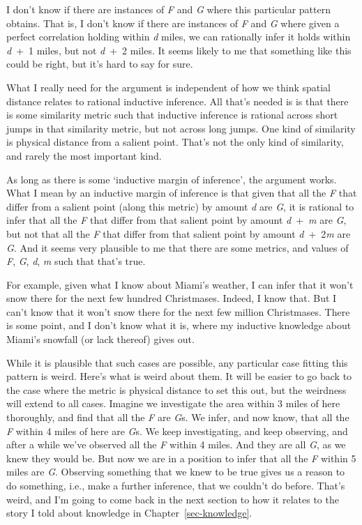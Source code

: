 \documentclass[
  12pt,
  letterpaper,
]{scrbook}
\begin{document}
I don't know if there are instances of \emph{F} and \emph{G} where this
particular pattern obtains. That is, I don't know if there are instances
of \emph{F} and \emph{G} where given a perfect correlation holding
within \emph{d} miles, we can rationally infer it holds within
\emph{d}~+~1 miles, but not \emph{d}~+~2 miles. It seems likely to me
that something like this could be right, but it's hard to say for sure.

What I really need for the argument is independent of how we think
spatial distance relates to rational inductive inference. All that's
needed is is that there is some similarity metric such that inductive
inference is rational across short jumps in that similarity metric, but
not across long jumps. One kind of similarity is physical distance from
a salient point. That's not the only kind of similarity, and rarely the
most important kind.

As long as there is some `inductive margin of inference', the argument
works. What I mean by an inductive margin of inference is that given
that all the \emph{F} that differ from a salient point (along this
metric) by amount \emph{d} are \emph{G}, it is rational to infer that
all the \emph{F} that differ from that salient point by amount
\emph{d}~+~\emph{m} are \emph{G}, but not that all the \emph{F} that
differ from that salient point by amount \emph{d}~+~2\emph{m} are
\emph{G}. And it seems very plausible to me that there are some metrics,
and values of \emph{F}, \emph{G}, \emph{d}, \emph{m} such that that's
true.

For example, given what I know about Miami's weather, I can infer that
it won't snow there for the next few hundred Christmases. Indeed, I know
that. But I can't know that it won't snow there for the next few million
Christmases. There is some point, and I don't know what it is, where my
inductive knowledge about Miami's snowfall (or lack thereof) gives out.

While it is plausible that such cases are possible, any particular case
fitting this pattern is weird. Here's what is weird about them. It will
be easier to go back to the case where the metric is physical distance
to set this out, but the weirdness will extend to all cases. Imagine we
investigate the area within 3 miles of here thoroughly, and find that
all the \emph{F} are \emph{G}s. We infer, and now know, that all the
\emph{F} within 4 miles of here are \emph{G}s. We keep investigating,
and keep observing, and after a while we've observed all the \emph{F}
within 4 miles. And they are all \emph{G}, as we knew they would be. But
now we are in a position to infer that all the \emph{F} within 5 miles
are \emph{G}. Observing something that we knew to be true gives us a
reason to do something, i.e., make a further inference, that we couldn't
do before. That's weird, and I'm going to come back in the next section
to how it relates to the story I told about knowledge in
Chapter~\ref{sec-knowledge}.
\end{document}
